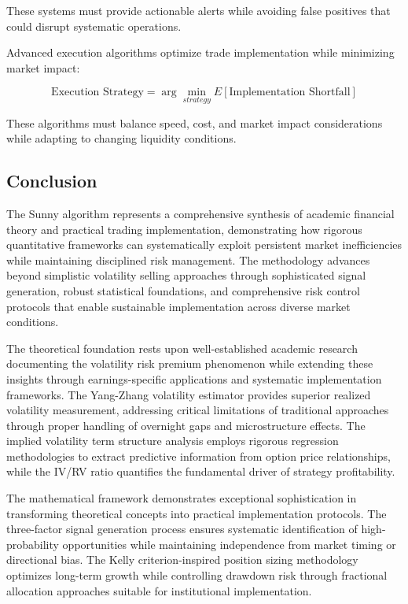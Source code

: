 \documentclass[
  american,
  11pt,
  11pt,
  letterpaper,
  onecolumn]{article}
\begin{document}
These systems must provide actionable alerts while avoiding false
positives that could disrupt systematic operations.

Advanced execution algorithms optimize trade implementation while
minimizing market impact:

\[\text{Execution Strategy} = \arg\min_{strategy} E[\text{Implementation Shortfall}]\]

These algorithms must balance speed, cost, and market impact
considerations while adapting to changing liquidity conditions.

\subsection{Conclusion}\label{conclusion}

The Sunny algorithm represents a comprehensive synthesis of academic
financial theory and practical trading implementation, demonstrating how
rigorous quantitative frameworks can systematically exploit persistent
market inefficiencies while maintaining disciplined risk management. The
methodology advances beyond simplistic volatility selling approaches
through sophisticated signal generation, robust statistical foundations,
and comprehensive risk control protocols that enable sustainable
implementation across diverse market conditions.

The theoretical foundation rests upon well-established academic research
documenting the volatility risk premium phenomenon while extending these
insights through earnings-specific applications and systematic
implementation frameworks. The Yang-Zhang volatility estimator provides
superior realized volatility measurement, addressing critical
limitations of traditional approaches through proper handling of
overnight gaps and microstructure effects. The implied volatility term
structure analysis employs rigorous regression methodologies to extract
predictive information from option price relationships, while the IV/RV
ratio quantifies the fundamental driver of strategy profitability.

The mathematical framework demonstrates exceptional sophistication in
transforming theoretical concepts into practical implementation
protocols. The three-factor signal generation process ensures systematic
identification of high-probability opportunities while maintaining
independence from market timing or directional bias. The Kelly
criterion-inspired position sizing methodology optimizes long-term
growth while controlling drawdown risk through fractional allocation
approaches suitable for institutional implementation.
\end{document}

